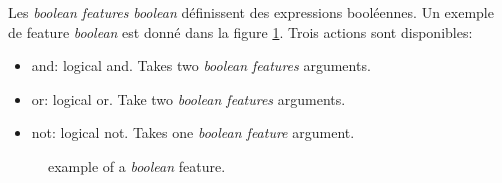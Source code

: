 \documentclass[manual-fr.tex]{subfiles}
\begin{document}
Les \textit{boolean features} \textit{boolean} définissent des expressions booléennes. Un exemple de feature \textit{boolean} est donné dans la figure \ref{fig:feature-boolean}. Trois actions sont disponibles:
\begin{itemize}
    \item and: logical and. Takes two \textit{boolean features} arguments.
    \item or: logical or. Take two \textit{boolean features} arguments.
    \item not: logical not. Takes one \textit{boolean feature} argument.
\end{itemize}

\begin{figure}[ht!]
\footnotesize
\begin{xml}
\end{xml}
\caption{example of a \textit{boolean} feature.}
\label{fig:feature-boolean}
\end{figure}
\end{document}
